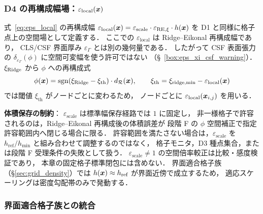 \subsubsection{\texorpdfstring{D4 の再構成幅場：$\varepsilon_\text{local}(\bm{x})$}{D4 の再構成幅場：ε\_local(x)}}
\label{sec:ridge_nu_eps_field}

式~\eqref{eq:eps_local} の再構成幅
$\varepsilon_\text{local}(\bm{x}) = \varepsilon_\text{scale}\cdot\varepsilon_{\mathrm{RE},\xi}\cdot h(\bm{x})$ を
D1 と同様に格子点上の空間場として定義する．
ここでの $\varepsilon_\text{local}$ は Ridge--Eikonal 再構成幅であり，
CLS/CSF 界面厚み $\varepsilon_\Gamma$ とは別の幾何量である．
したがって CSF 表面張力の $\delta_{\varepsilon_\Gamma}(\phi)$ に空間可変幅を使う許可ではない
（§~\ref{box:eps_xi_csf_warning}）．
$\xi_{\text{Ridge}}$ から $\phi$ への再構成式
\begin{equation*}
  \phi(\bm{x}) = \operatorname{sgn}(\xi_{\text{Ridge}} - \xi_\text{th})\cdot d_\mathcal{R}(\bm{x}),
  \qquad \xi_\text{th} = \xi_\text{ridge,min} - \varepsilon_\text{local}(\bm{x})
\end{equation*}
では閾値 $\xi_\text{th}$ がノードごとに変わるため，
ノードごとに $\varepsilon_\text{local}(\bm{x}_{i,j})$ を用いる．

\noindent\textbf{体積保存の制約}：
$\varepsilon_\text{scale}$ は標準幅保存経路では $1$ に固定し，
非一様格子で許容されるのは，Ridge--Eikonal 再構成後の体積誤差が
段階 F の $\phi$ 空間補正で指定許容範囲内へ閉じる場合に限る．
許容範囲を満たさない場合は，$\varepsilon_\text{scale}$ を
$h_\text{ref}/h_\text{min}$ と組み合わせて調整するのではなく，
格子モニタ，D3 種点集合，または段階 F 受理条件の失敗として扱う．
$\varepsilon_\text{scale}\ne1$ の空間倍率較正は比較・感度検証であり，
本章の固定格子標準閉包には含めない．
界面適合格子族（\S\ref{sec:grid_density}）では
$h(\bm{x}) \approx h_\text{ref}$ が界面近傍で成立するため，
適応スケーリングは密度勾配帯のみで発動する．

\subsubsection{界面適合格子族との統合}
\label{sec:ridge_nu_interface_fitted}

